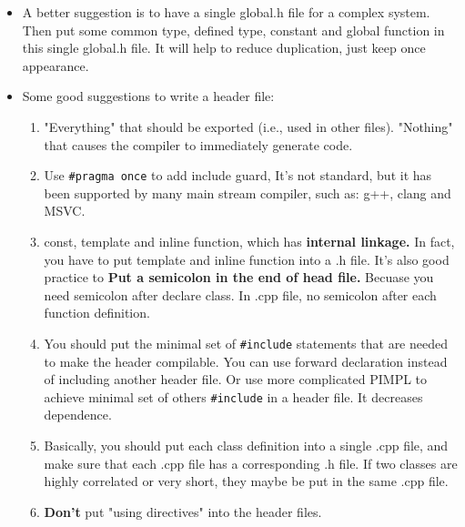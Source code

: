 \documentclass[a4paper,11pt,twoside]{book}
\begin{document}
\begin{itemize}
	\item A better suggestion is to have a single global.h file for a complex system. Then put some common type, defined type, constant and global function in this single global.h file. It will help to reduce duplication, just keep once appearance.
	
	\item Some good suggestions to write a header file:
	\begin{enumerate}
		\item "Everything" that should be exported (i.e., used in other files). "Nothing" that causes the compiler to immediately generate code.
		
		\item Use \texttt{\#pragma once} to add include guard, It's not standard, but it has been supported by many main stream compiler, such as: g++, clang and MSVC.

		\item const, template and inline function, which has \textbf{internal linkage.} In fact, you have to put template and inline function into a .h file. It's also good practice to \textbf{Put a semicolon in the end of head file.} Becuase you need semicolon after declare class. In .cpp file, no semicolon after each function definition.

		\item You should put the minimal set of \texttt{\#include} statements that are needed to make the header compilable. You can use forward declaration instead of including another header file. Or use more complicated PIMPL to achieve minimal set of others \texttt{\#include} in a header file. It decreases dependence.
		
		\item Basically, you should put each class definition into a single .cpp file, and make sure that each .cpp file has a corresponding .h file.  If two classes are highly correlated or very short, they maybe be put in the same .cpp file.

        \item \textbf{Don't} put "using directives" into the header files.
	\end{enumerate}


\end{itemize}
\end{document}
